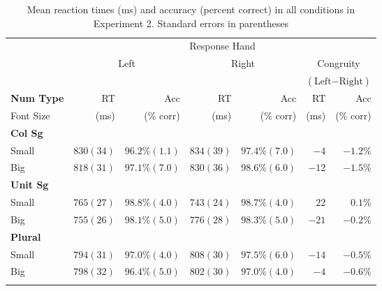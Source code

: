 \documentclass[output=paper]{langscibook}
\begin{document}

\begin{table}[]
\caption{Mean reaction times (ms) and accuracy (percent correct) in all conditions in Experiment 2. Standard errors in parentheses}
\label{gul-bla:tab:all-conditions-exp2}
\begin{tabularx}{.97\textwidth}{X r@{~~~}r r@{~~~}r r@{~~~}r}
\lsptoprule
&\multicolumn{6}{c}{Response Hand}\\\cmidrule(lr){2-7}
&\multicolumn{2}{c}{\multirow{2}{*}{Left}}&\multicolumn{2}{c}{\multirow{2}{*}{Right}}&\multicolumn{2}{c}{Congruity}\\
&&&&&\multicolumn{2}{c}{($\text{Left}-\text{Right}$)}\\\cmidrule(lr){2-3}\cmidrule(lr){4-5}\cmidrule(lr){6-7}
\textbf{Num Type}&RT&Acc&RT&Acc&RT&Acc\\
\hspace{6pt}Font Size&(ms)&(\% corr)&(ms)&(\% corr)&(ms)&(\% corr)\\\midrule
\textbf{Col Sg}\\
\hspace{6pt}Small& $830 (34)$ & $96.2\% (1.1)$ & $834 (39)$ & $97.4\% (7.0)$ & $-4$  & $-1.2\%$ \\
\hspace{6pt}Big& $818 (31)$ & $97.1\% (7.0)$ & $830 (36)$ & $98.6\% (6.0)$ & $-12$ & $-1.5\%$ \\\tablevspace
\textbf{Unit Sg}\\
\hspace{6pt}Small& $765 (27)$ & $98.8\% (4.0)$ & $743 (24)$ & $98.7\% (4.0)$ & $22$  & $0.1\%$  \\
\hspace{6pt}Big& $755 (26)$ & $98.1\% (5.0)$ & $776 (28)$ & $98.3\% (5.0)$ & $-21$ & $-0.2\%$ \\\tablevspace
\textbf{Plural}\\
\hspace{6pt}Small&$794 (31)$ & $97.0\% (4.0)$ & $808 (30)$ & $97.5\% (6.0)$ & $-14$ & $-0.5\%$ \\
\hspace{6pt}Big& $798 (32)$ & $96.4\% (5.0)$ & $802 (30)$ & $97.0\% (4.0)$ & $-4$  & $-0.6\%$ \\
\lspbottomrule
\end{tabularx}
\end{table}
\end{document}
